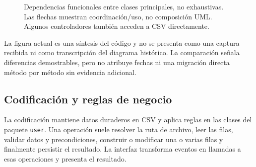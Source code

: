\begin{figure}[H]
\centering
{}
\caption{Dependencias funcionales entre clases principales, no exhaustivas. Las flechas muestran coordinación/uso, no composición UML. Algunos controladores también acceden a CSV directamente.}
\label{fig:diagrama-clases}
\end{figure}

La figura actual es una síntesis del código y no se presenta como una captura recibida ni como transcripción del diagrama histórico. La comparación señala diferencias demostrables, pero no atribuye fechas ni una migración directa método por método sin evidencia adicional.

\subsection{Codificación y reglas de negocio}
\label{subsec:codificacion}

La codificación mantiene datos duraderos en CSV y aplica reglas en las clases del paquete \texttt{user}. Una operación suele resolver la ruta de archivo, leer las filas, validar datos y precondiciones, construir o modificar una o varias filas y finalmente persistir el resultado. La interfaz transforma eventos en llamadas a esas operaciones y presenta el resultado.

